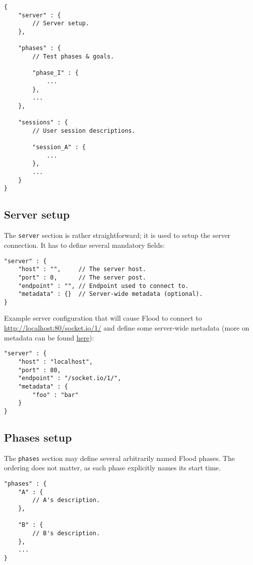 \documentclass[a4paper]{article}
\begin{document}
\begin{verbatim}
{
    "server" : {
        // Server setup.
    },

    "phases" : {
        // Test phases & goals.

        "phase_I" : {
            ...
        },
        ...
    },

    "sessions" : {
        // User session descriptions.

        "session_A" : {
            ...
        },
        ...
    }
}
\end{verbatim}
\subsection{Server setup}
\label{sec-3-2}

The \texttt{server} section is rather straightforward; it is used to setup the server connection. It has to define several mandatory fields:


\begin{verbatim}
"server" : {
    "host" : "",     // The server host.
    "port" : 0,      // The server post.
    "endpoint" : "", // Endpoint used to connect to.
    "metadata" : {}  // Server-wide metadata (optional).
}
\end{verbatim}




\noindent
Example server configuration that will cause Flood to connect to \href{http://localhost:80/socket.io/1/}{http://localhost:80/socket.io/1/} and define some server-wide metadata (more on metadata can be found \hyperref[sec-3-5]{here}):


\begin{verbatim}
"server" : {
    "host" : "localhost",
    "port" : 80,
    "endpoint" : "/socket.io/1/",
    "metadata" : {
        "foo" : "bar"
    }
}
\end{verbatim}
\subsection{Phases setup}
\label{sec-3-3}
\label{ref-phase_setup}


The \texttt{phases} section may define several arbitrarily named Flood phases. The ordering does not matter, as each phase explicitly names its start time.


\begin{verbatim}
"phases" : {
    "A" : {
        // A's description.
    },

    "B" : {
        // B's description.
    },
    ...
}
\end{verbatim}
\end{document}
